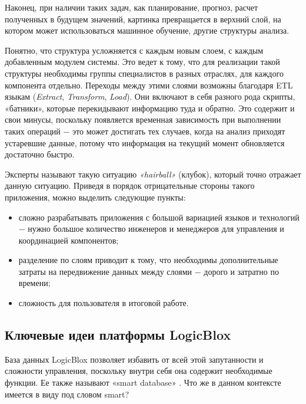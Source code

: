 Наконец, при наличии таких задач, как планирование, прогноз, расчет полученных в будущем значений, картинка превращается в верхний слой, на котором может использоваться машинное обучение, другие структуры анализа.

Понятно, что структура усложняется с каждым новым слоем, с каждым добавленным модулем системы. Это ведет к тому, что для реализации такой структуры необходимы группы специалистов в разных отраслях, для каждого компонента отдельно. Переходы между этими слоями возможны благодаря ETL языкам (\emph{Extract}, \emph{Transform}, \emph{Load}). Они включают в себя разного рода скрипты, «батники», которые перекидывают информацию туда и обратно. Это содержит и свои минусы, поскольку появляется временная зависимость при выполнении таких операций ​− это может достигать тех случаев, когда на анализ приходят устаревшие данные, потому что информация на текущий момент обновляется достаточно быстро.

Эксперты называют такую ситуацию \emph{«hairball»} (клубок), который точно отражает данную ситуацию. Приведя в порядок отрицательные стороны такого приложения, можно выделить следующие пункты:
\begin{itemize}
  \item сложно разрабатывать приложения с большой вариацией языков и технологий ​− нужно большое количество инженеров и менеджеров для управления и координацией компонентов;
  \item разделение по слоям приводит к тому, что необходимы дополнительные затраты на передвижение данных между слоями ​− дорого и затратно по времени;
  \item сложность для пользователя в итоговой работе.
\end{itemize}

\subsection{Ключевые идеи платформы LogicBlox}
\label{sec:domain:framework_key_ideas}

База данных LogicBlox позволяет избавить от всей этой запутанности и сложности управления, поскольку внутри себя она содержит необходимые функции. Ее также называют «smart database» \cite{kurt_lecture}. Что же в данном контексте имеется в виду под словом smart?

